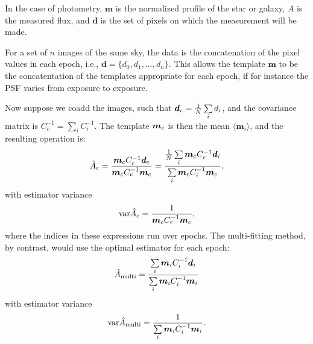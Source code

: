 \documentclass[a4paper,fleqn,usenatbib,referee]{mnras}
\begin{document}
In the case of photometry, $\boldsymbol{m}$ is the normalized profile of the
star or galaxy, $A$ is the measured flux, and $\boldsymbol{d}$ is the set of
pixels on which the measurement will be made.

For a set of $n$ images of the same sky, the data is the concatenation of the
pixel values in each epoch, i.e., $\boldsymbol{d} = \{d_0, d_1, ..., d_n \}$.
This allows the template $\boldsymbol{m}$ to be the concatentation of the
templates appropriate for each epoch, if for instance the PSF varies from
exposure to exposure.

Now suppose we coadd the images, such that $\boldsymbol{d}_{\rm c} = \frac{1}{N}\sum\limits_i
d_i$, and the covariance matrix is $C_c^{-1} = \sum\limits_i C_i^{-1}$.
The template $\boldsymbol{m}_{\rm c}$ is then the mean $\langle
\boldsymbol{m}_i\rangle$, and the resulting operation is:
\begin{align}
    \hat{A}_{\rm c} = \frac{\boldsymbol{m}_{\rm c} C_c^{-1}\boldsymbol{d}_c}{\boldsymbol{m}_{\rm c} C_c^{-1}\boldsymbol{m}_{\rm c}} = \frac{\frac{1}{N}\sum\limits_i \boldsymbol{m}_{\rm c} C_c^{-1}  \boldsymbol{d}_i}{\sum\limits_i \boldsymbol{m}_{\rm c} C_i^{-1}\boldsymbol{m}_{\rm c}},
\end{align}
with estimator variance
\begin{align} \label{eq:coaddvarest}
{\rm var}\hat{A}_{\rm c} = \frac{1}{\boldsymbol{m}_{\rm c} C_c^{-1}\boldsymbol{m}_{\rm c}},
\end{align}
where the indices in these expressions run over epochs. The multi-fitting
method, by contrast, would use the optimal estimator for each epoch:
\begin{align}
\hat{A}_{\rm multi} = \frac{\sum\limits_i \boldsymbol{m}_i C_i^{-1}\boldsymbol{d}_i}{\sum\limits_i \boldsymbol{m}_i C_i^{-1}\boldsymbol{m}_i}
\end{align}
with estimator variance
\begin{align}
{\rm var}\hat{A}_{\rm multi} = \frac{1}{\sum\limits_i \boldsymbol{m}_i C_i^{-1}\boldsymbol{m}_i}.
\end{align}
\end{document}
